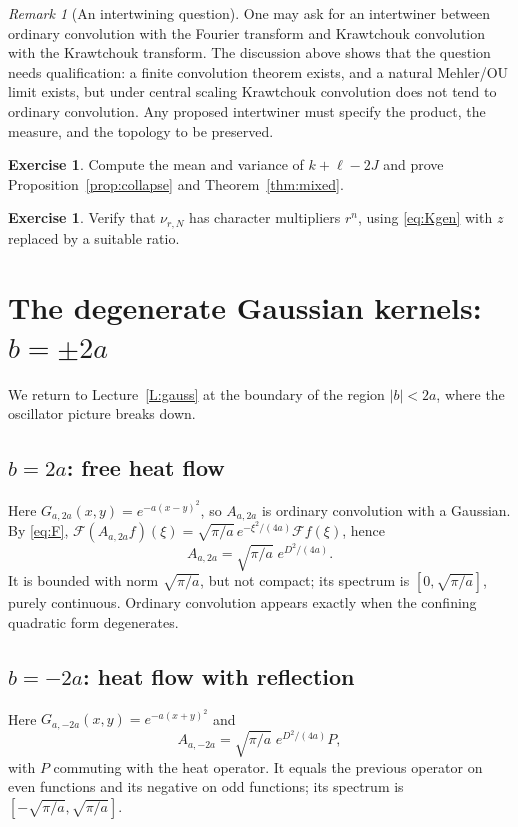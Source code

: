 \documentclass[11pt,reqno]{amsart}
\theoremstyle{definition}
\newtheorem{exercise}[theorem]{Exercise}
\theoremstyle{remark}
\newtheorem{remark}[theorem]{Remark}
\newcommand{\F}{\mathcal F}
\begin{document}
\begin{remark}[An intertwining question]
One may ask for an intertwiner between ordinary convolution with the
Fourier transform and Krawtchouk convolution with the Krawtchouk
transform. The discussion above shows that the question needs
qualification: a finite convolution theorem exists, and a natural
Mehler/OU limit exists, but under central scaling Krawtchouk convolution
does not tend to ordinary convolution. Any proposed intertwiner must
specify the product, the measure, and the topology to be preserved.
\end{remark}

\begin{exercise}
Compute the mean and variance of $k+\ell-2J$ and prove
Proposition~\ref{prop:collapse} and Theorem~\ref{thm:mixed}.
\end{exercise}
\begin{exercise}
Verify that $\nu_{r,N}$ has character multipliers $r^n$, using
\eqref{eq:Kgen} with $z$ replaced by a suitable ratio.
\end{exercise}

\section{The degenerate Gaussian kernels: $b=\pm2a$}\label{L:end}
We return to Lecture~\ref{L:gauss} at the boundary of the region
$|b|<2a$, where the oscillator picture breaks down.

\subsection{$b=2a$: free heat flow}
Here $G_{a,2a}(x,y)=e^{-a(x-y)^2}$, so $A_{a,2a}$ is ordinary convolution
with a Gaussian. By \eqref{eq:F},
$\F(A_{a,2a}f)(\xi)=\sqrt{\pi/a}\,e^{-\xi^2/(4a)}\F f(\xi)$, hence
\[
A_{a,2a}=\sqrt{\pi/a}\;e^{D^2/(4a)}.
\]
It is bounded with norm $\sqrt{\pi/a}$, but not compact; its spectrum is
$[0,\sqrt{\pi/a}]$, purely continuous. Ordinary convolution appears
exactly when the confining quadratic form degenerates.

\subsection{$b=-2a$: heat flow with reflection}
Here $G_{a,-2a}(x,y)=e^{-a(x+y)^2}$ and
\[
A_{a,-2a}=\sqrt{\pi/a}\;e^{D^2/(4a)}P,
\]
with $P$ commuting with the heat operator. It equals the previous
operator on even functions and its negative on odd functions; its
spectrum is $[-\sqrt{\pi/a},\sqrt{\pi/a}]$.
\end{document}

